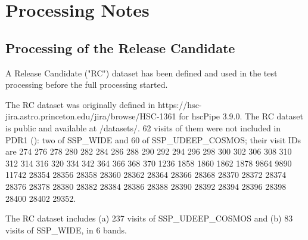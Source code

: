 \documentclass[DM,authoryear,toc]{lsstdoc}
\begin{document}
\section{Processing Notes}
\subsection{Processing of the Release Candidate}

A Release Candidate ("RC") dataset has been defined and used in the test processing before the full processing started.

The RC dataset was originally defined in https://hsc-jira.astro.princeton.edu/jira/browse/HSC-1361 for hscPipe 3.9.0.
The RC dataset is public and available at /datasets/. 62 visits of them were not included in PDR1 (): two of SSP{\_}WIDE and 60 of SSP{\_}UDEEP{\_}COSMOS; their visit IDs are 274 276 278 280 282 284 286 288 290 292 294 296 298 300 302 306 308 310 312 314 316 320 334 342 364 366 368 370 1236 1858 1860 1862 1878 9864 9890 11742 28354 28356 28358 28360 28362 28364 28366 28368 28370 28372 28374 28376 28378 28380 28382 28384 28386 28388 28390 28392 28394 28396 28398 28400 28402 29352.

The RC dataset includes (a) 237 visits of SSP{\_}UDEEP{\_}COSMOS and (b) 83 visits of SSP{\_}WIDE, in 6 bands.
\end{document}
